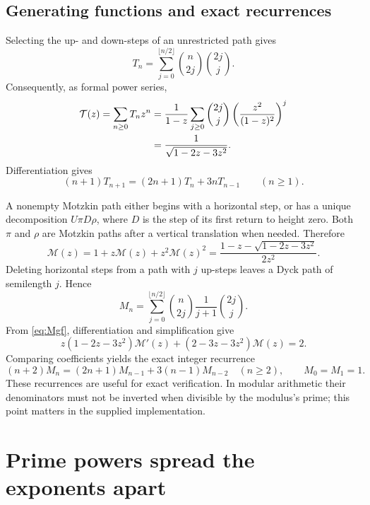 \documentclass[11pt,a4paper]{article}
\numberwithin{equation}{section}
\theoremstyle{definition}
\theoremstyle{remark}
\begin{document}
\subsection{Generating functions and exact recurrences}
Selecting the up- and down-steps of an unrestricted path gives
\begin{equation}\label{eq:Tsum}
 T_n=\sum_{j=0}^{\lfloor n/2\rfloor}\binom n{2j}\binom{2j}j.
\end{equation}
Consequently, as formal power series,
\begin{align}
 \mathcal T(z)=\sum_{n\geq0}T_nz^n
 &=\frac1{1-z}\sum_{j\geq0}\binom{2j}j
       \left(\frac{z^2}{(1-z)^2}\right)^j\notag\\
 &=\frac1{\sqrt{1-2z-3z^2}}.\label{eq:Tgf}
\end{align}
Differentiation gives
\begin{equation}\label{eq:Trec}
 (n+1)T_{n+1}=(2n+1)T_n+3nT_{n-1}\qquad(n\geq1).
\end{equation}

A nonempty Motzkin path either begins with a horizontal step, or has a
unique decomposition $U\pi D\rho$, where $D$ is the step of its first
return to height zero. Both $\pi$ and $\rho$ are Motzkin paths after a
vertical translation when needed. Therefore
\begin{equation}\label{eq:Mgf}
 \mathcal M(z)=1+z\mathcal M(z)+z^2\mathcal M(z)^2
 =\frac{1-z-\sqrt{1-2z-3z^2}}{2z^2}.
\end{equation}
Deleting horizontal steps from a path with $j$ up-steps leaves a Dyck
path of semilength $j$. Hence
\begin{equation}\label{eq:Msum}
 M_n=\sum_{j=0}^{\lfloor n/2\rfloor}\binom n{2j}
                  \frac1{j+1}\binom{2j}j.
\end{equation}
From \eqref{eq:Mgf}, differentiation and simplification give
\[
 z(1-2z-3z^2)\mathcal M'(z)
 +(2-3z-3z^2)\mathcal M(z)=2.
\]
Comparing coefficients yields the exact integer recurrence
\begin{equation}\label{eq:Mrec}
 (n+2)M_n=(2n+1)M_{n-1}+3(n-1)M_{n-2}\quad(n\geq2),
 \qquad M_0=M_1=1.
\end{equation}
These recurrences are useful for exact verification. In modular
arithmetic their denominators must not be inverted when divisible by the
modulus's prime; this point matters in the supplied implementation.

\section{Prime powers spread the exponents apart}\label{sec:transfer}
\end{document}
